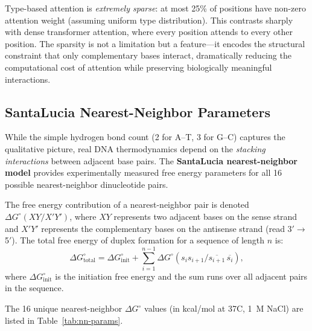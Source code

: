 \begin{keyinsight}
Type-based attention is \emph{extremely sparse}: at most 25\% of positions have non-zero attention weight (assuming uniform type distribution). This contrasts sharply with dense transformer attention, where every position attends to every other position. The sparsity is not a limitation but a feature---it encodes the structural constraint that only complementary bases interact, dramatically reducing the computational cost of attention while preserving biologically meaningful interactions.
\end{keyinsight}

\subsection{SantaLucia Nearest-Neighbor Parameters}
\label{subsec:santalucia}

While the simple hydrogen bond count (2 for A--T, 3 for G--C) captures the qualitative picture, real DNA thermodynamics depend on the \emph{stacking interactions} between adjacent base pairs. The \textbf{SantaLucia nearest-neighbor model} \citep{santalucia1998} provides experimentally measured free energy parameters for all 16 possible nearest-neighbor dinucleotide pairs.

\begin{definition}
\label{def:nearest-neighbor}
The free energy contribution of a nearest-neighbor pair is denoted $\Delta G^{\circ}(XY/X'Y')$, where $XY$ represents two adjacent bases on the sense strand and $X'Y'$ represents the complementary bases on the antisense strand (read 3\('\to\)5\('\)). The total free energy of duplex formation for a sequence of length $n$ is:
\begin{equation}
\Delta G^{\circ}_{\text{total}} = \Delta G^{\circ}_{\text{init}} + \sum_{i=1}^{n-1} \Delta G^{\circ}(s_i s_{i+1} / \overline{s_{i+1}}\, \overline{s_i}),
\label{eq:total-free-energy}
\end{equation}
where $\Delta G^{\circ}_{\text{init}}$ is the initiation free energy and the sum runs over all adjacent pairs in the sequence.
\end{definition}

The 16 unique nearest-neighbor $\Delta G^{\circ}$ values (in kcal/mol at 37\textdegree C, 1~M NaCl) are listed in Table~\ref{tab:nn-params}.

